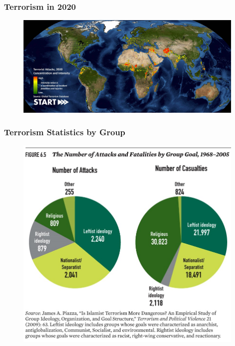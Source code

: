 \documentclass{beamer}
\begin{document}
\begin{frame} 
	\frametitle{\LARGE{Terrorism in 2020}}
	\begin{figure}[ht!]
		\centering
		\includegraphics[width=\textwidth,height=\textheight,keepaspectratio]{START_GTD-Heatmap_2020.jpg}
	\end{figure}
\end{frame}


\begin{frame} 
	\frametitle{\LARGE{Terrorism Statistics by Group}}
	\begin{figure}[ht!]
		\centering
		\includegraphics[width=\textwidth,height=\textheight,keepaspectratio]{Piazza2005.jpg}
	\end{figure}
\end{frame}
\end{document}
